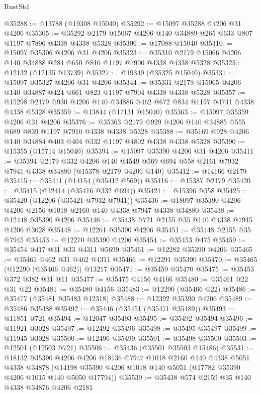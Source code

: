 \begin{lexlean}{RustStd}
\begin{coremodule}
@35288 := @13788 (@19308 @15040)
@35292 := @15097 @35288 @4206 @31 @4206
@35305 := @35292 @2179 @15067 @4206 @140 @34889 @265 @633 @807 @1197 @7896 @4338 @4338 @5328
@35306 := @17088 @15040
@35310 := @15097 @35306 @4206 @31 @4206
@35323 := @35310 @2179 @15066 @4206 @140 @34888 @284 @650 @816 @1197 @7900 @4338 @4338 @5328
@35325 := @12132 (@12135 @13739)
@35327 := @19349 (@35325 @15040)
@35331 := @15097 @35327 @4206 @31 @4206
@35344 := @35331 @2179 @15065 @4206 @140 @34887 @424 @661 @823 @1197 @7904 @4338 @4338 @5328
@35357 := @15298 @2179 @930 @4206 @140 @34886 @462 @672 @834 @1197 @4741 @4338 @4338 @5328
@35359 := @13844 (@17131 @15040)
@35363 := @15097 @35359 @4206 @31 @4206
@35376 := @35363 @2179 @929 @4206 @140 @34885 @555 @689 @839 @1197 @7910 @4338 @4338 @5328
@35388 := @35169 @928 @4206 @140 @34884 @403 @404 @332 @1197 @4802 @4338 @4338 @5328
@35390 := @15355 (@15714 @15040)
@35394 := @15097 @35390 @4206 @31 @4206
@35411 := @35394
    @2179
    @332
    @4206
    @140
    @4549
    @569
    @694
    @558
    @2161
    @7932
    @7941
    @4338
    @34880
    (@15378 @2179 @4206 @140)
@35412 := @14166 @2179
@35415 := @35411 (@14154 (@35412 @569))
@35416 := @15387 @2179
@35420 := @35415 (@12414 (@35416 @332 @694))
@35421 := @15396 @558
@35425 := @35420 (@12206 (@35421 @7932 @7941))
@35436 := @18097 @35390 @4206 @4206 @2156 @1018 @2160 @140 @4338 @7947 @4338 @34880
@35438 := @12448 @35390 @4206
@35446 := @35438 @721 @2155 @35 @140 @4338 @7945 @4206 @3028
@35448 := @12261 @35390 @4206
@35451 := @35448 @2155 @35 @7945
@35453 := @12270 @35390 @4206
@35454 := @35453 @475
@35459 := @35454 @417 @31 @33 @4311 @5699
@35461 := @12282 @35390 @4206
@35465 := @35461 @462 @31 @462 @4311
@35466 := @12291 @35390
@35470 := @35465 (@12290 (@35466 @462)) @13217
@35471 := @35459 @35470
@35475 := @35453 @372 @382 @31 @11
@35477 := @35475 @4156 @4166
@35480 := @35461 @22 @31 @22
@35481 := @35480 @4156
@35483 := @12290 (@35466 @22)
@35486 := @35477 (@35481 @35483 @12318)
@35488 := @12392 @35390 @4206
@35489 := @35486 @35488
@35492 := @35446 (@35451 (@35471 @35489))
@35493 := @11851 @721
@35494 := @12047 @35493
@35495 := @35492 @35494
@35496 := @11921 @3028
@35497 := @12492 @35496
@35498 := @35495 @35497
@35499 := @11945 @3028
@35500 := @12496 @35499
@35501 := @35498 @35500
@35503 := @12501 (@12503 @721)
@35506 := @35436 (@35501 @35503 @15486)
@35531 := @18132
    @35390
    @4206
    @4206
    @18136
    @7947
    @1018
    @2160
    @140
    @4338
    @5051
    @4338
    @34878
    (@14198 @35390 @4206 @1018 @140 @5051 (@17782 @35390 @4206 @1015 @140 @5050 @17794))
@35539 := @35438 @574 @2159 @35 @140 @4338 @34876 @4206 @2181

\end{coremodule}
\end{lexlean}
